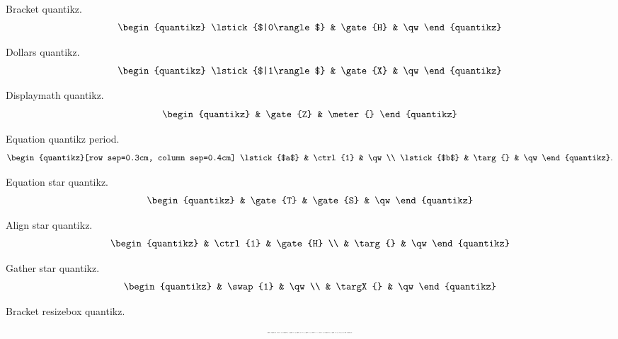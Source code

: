 \documentclass{article}
\begin{document}
Bracket quantikz.
\[ \begin{quantikz} \lstick{$|0\rangle$} & \gate{H} & \qw \end{quantikz} \]

Dollars quantikz.
$$ \begin{quantikz} \lstick{$|1\rangle$} & \gate{X} & \qw \end{quantikz} $$

Displaymath quantikz.
\begin{displaymath}
\begin{quantikz} & \gate{Z} & \meter{} \end{quantikz}
\end{displaymath}

Equation quantikz period.
\begin{equation}
\begin{quantikz}[row sep=0.3cm, column sep=0.4cm]
\lstick{$a$} & \ctrl{1} & \qw \\
\lstick{$b$} & \targ{} & \qw
\end{quantikz}.
\label{eq:circuit}
\end{equation}

Equation star quantikz.
\begin{equation*}
\begin{quantikz} & \gate{T} & \gate{S} & \qw \end{quantikz}
\end{equation*}

Align star quantikz.
\begin{align*}
\begin{quantikz}
& \ctrl{1} & \gate{H} \\
& \targ{} & \qw
\end{quantikz}
\end{align*}

Gather star quantikz.
\begin{gather*}
\begin{quantikz} & \swap{1} & \qw \\ & \targX{} & \qw \end{quantikz}
\end{gather*}

Bracket resizebox quantikz.
\[ \resizebox{0.25\textwidth}{!}{%
\begin{quantikz}
\lstick{$|0\rangle$} & \gate{H} & \gate[2]{U_f} & \gate{H} & \meter{} \\
\lstick{$|1\rangle$} & \gate{H} & & \qw & \qw
\end{quantikz}} \]
\end{document}
